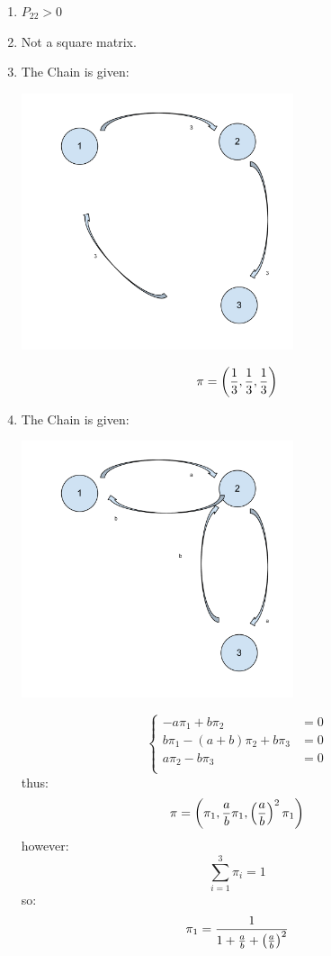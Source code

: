\documentclass[12pt]{article}
\begin{document}
\begin{enumerate}
\begin{enumerate}
\item $P_{22}>0$
\item Not a square matrix.
\item The Chain is given:\\

\begin{center}
\includegraphics[width=8cm]{Markov_Chains_Ex_4-c.pdf}
\end{center}
$$\pi=\left({1\over3},{1\over3},{1\over3}\right)$$


\item The Chain is given:\\
\begin{center}
\includegraphics[width=8cm]{Markov_Chains_Ex_4-d.pdf}
\end{center}
$$ \begin{cases}
-a\pi_1+b\pi_2&=0\\
b\pi_1-(a+b)\pi_2+b\pi_3&=0\\
a\pi_2-b\pi_3&=0\\
\end{cases}
$$
thus:
$$\pi=\left(\pi_1,{a\over b}\pi_1,\left({a\over b}\right)^2\pi_1\right)$$
however:
$$\sum_{i=1}^3\pi_i=1$$
so:
$$\pi_1={1\over 1+{a\over b}+\left({a\over b}\right)^2}$$



\end{enumerate}
\end{enumerate}
\end{document}
